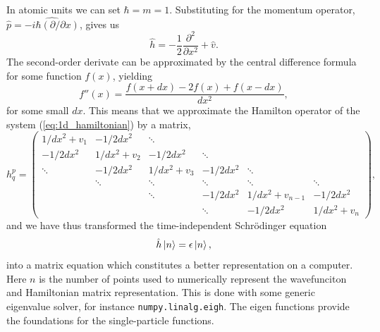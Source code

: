 In atomic units we can set $\hbar = m = 1$. Substituting for the 
momentum operator, $\hat{p} = \hat{-i\hbar (\partial / \partial x)}$, gives us 
\begin{equation}
    \label{eq:1d_hamiltonian}
    \hat{h} = - \frac{1}{2} \frac{\partial^2}{\partial x^2} + \hat{v}.
\end{equation}
The second-order derivate can be approximated by the central difference 
formula for some function $f(x)$, yielding
\begin{equation}
    f''(x) = \frac{f(x + dx) - 2f(x) +f(x - dx)}{dx^2},
\end{equation}
for some small $dx$. This means that we approximate the Hamilton 
operator of the system (\autoref{eq:1d_hamiltonian}) by a matrix,
\begin{equation}
    h^p_q =  \begin{pmatrix}
    1/dx^2 + v_1 & -1/2dx^2 & \ddots & & & \\
    -1/2dx^2 & 1/dx^2 + v_2 & -1/2dx^2 & \ddots & & \\
    \ddots & -1/2dx^2 & 1/dx^2 + v_3 & -1/2dx^2 & \ddots & \\
    & \ddots & \ddots & \ddots & \ddots & \ddots \\
    & & \ddots & -1/2dx^2 & 1/dx^2 + v_{n-1} & -1/2dx^2 \\
    & & & \ddots & -1/2dx^2 & 1/dx^2 + v_n
    \end{pmatrix},
\end{equation}
and we have thus transformed the time-independent Schrödinger equation
\begin{equation}
    \hat{h} \ket{n} = \epsilon \ket{n},
\end{equation}
into a matrix equation which constitutes a better representation on 
a computer. Here $n$ is 
the number of points used to numerically represent the wavefunciton 
and Hamiltonian matrix representation. This is done with some generic 
eigenvalue solver, for instance \lstinline{numpy.linalg.eigh}.
The eigen functions provide the foundations for the single-particle functions.

